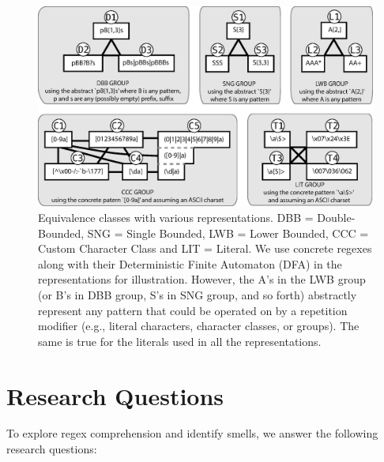 \begin{figure}[tb]
\centering
\includegraphics[width=\textwidth]{illustrations/refactoringTree.eps}
\vspace{-6pt}
\caption{Equivalence classes with various representations. DBB = Double-Bounded, SNG = Single Bounded, LWB = Lower Bounded, CCC = Custom Character Class and LIT = Literal. We use concrete regexes along with their Deterministic Finite Automaton (DFA) in the representations for illustration. However, the A's in the LWB group (or B's in DBB group, S's in SNG group, and so forth) abstractly represent any pattern that could be operated on by a repetition modifier (e.g., literal characters, character classes, or groups). The same is true for the literals used in all the representations. }
\vspace{-6pt}
\label{fig:refactoringTree}
\end{figure}


\section{Research Questions}
\label{sec:study}

To explore regex comprehension and identify smells, we answer the following research questions: \\

